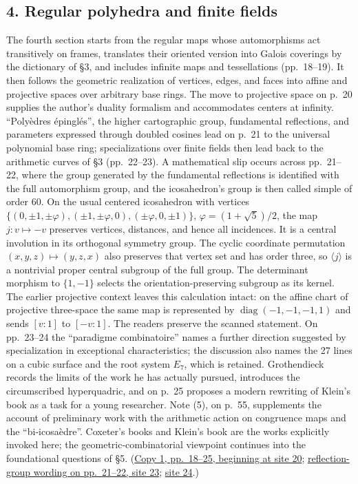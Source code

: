 \documentclass[11pt,a4paper]{article}
\begin{document}
\subsection*{4. Regular polyhedra and finite fields}
The fourth section starts from the regular maps whose automorphisms act
transitively on frames, translates their oriented version into Galois
coverings by the dictionary of \S3, and includes infinite maps and
tessellations (pp.~18--19). It then follows the geometric realization of
vertices, edges, and faces into affine and projective spaces over arbitrary
base rings. The move to projective space on p.~20 supplies the author's
duality formalism and accommodates centers at infinity. ``Polyèdres
épinglés'', the higher cartographic group, fundamental reflections, and
parameters expressed through doubled cosines lead on p.~21 to the
universal polynomial base ring; specializations over finite fields then
lead back to the arithmetic curves of \S3 (pp.~22--23). A mathematical
slip occurs across pp.~21--22, where the group generated by the fundamental
reflections is identified with the full automorphism group, and the
icosahedron's group is then called simple of order 60. On the usual
centered icosahedron with vertices
$\{(0,\pm1,\pm\varphi),(\pm1,\pm\varphi,0),(\pm\varphi,0,\pm1)\}$,
$\varphi=(1+\sqrt5)/2$, the map $j:v\mapsto-v$ preserves vertices,
distances, and hence all incidences. It is a central involution in its
orthogonal symmetry group. The cyclic coordinate permutation
$(x,y,z)\mapsto(y,z,x)$ also preserves that vertex set and has order three,
so $\langle j\rangle$ is a nontrivial proper central subgroup of the full
group. The determinant morphism to $\{1,-1\}$ selects the
orientation-preserving subgroup as its kernel. The earlier projective
context leaves this calculation intact: on the affine chart of projective
three-space the same map is represented by
$\operatorname{diag}(-1,-1,-1,1)$ and sends $[v:1]$ to $[-v:1]$.
The readers preserve the scanned statement. On pp.~23--24 the
``paradigme combinatoire'' names a further direction suggested by
specialization in exceptional characteristics; the discussion also names
the 27 lines on a cubic surface and the root system $E_7$, which is
retained. Grothendieck records the limits of the work he has actually
pursued, introduces the circumscribed hyperquadric, and on p.~25 proposes
a modern rewriting of Klein's book as a task for a young researcher.
Note (5), on p.~55, supplements the account of preliminary work with
the arithmetic action on congruence maps and the ``bi-icosaèdre''.
Coxeter's books and Klein's book are the works explicitly invoked here;
the geometric-combinatorial viewpoint continues into the foundational
questions of \S5.
(\href{https://grothendieck.umontpellier.fr/web/viewer.html?file=../119.pdf\#page=21}{Copy 1, pp.~18--25, beginning at site 20};
\href{https://grothendieck.umontpellier.fr/web/viewer.html?file=../119.pdf\#page=24}{reflection-group wording on pp.~21--22, site 23};
\href{https://grothendieck.umontpellier.fr/web/viewer.html?file=../119.pdf\#page=25}{site 24}.)
\end{document}

